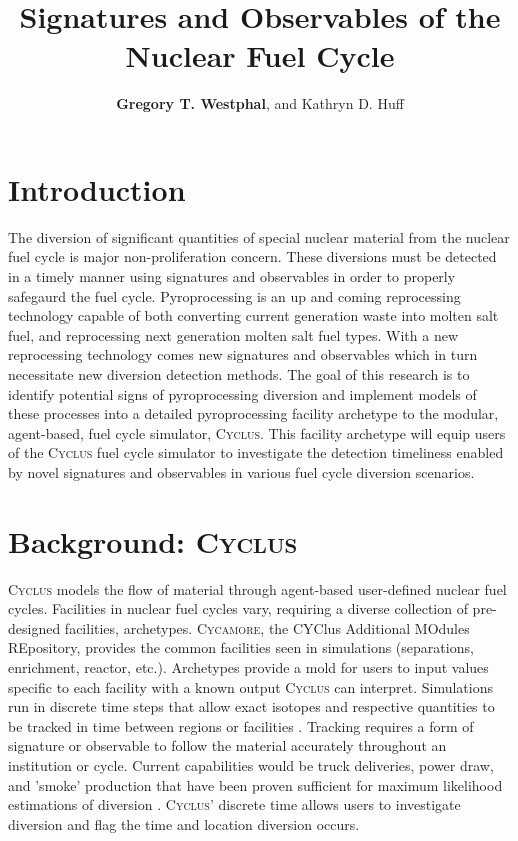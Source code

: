 \documentclass{anstrans}
\title{Signatures and Observables of the Nuclear Fuel Cycle}
\author{\textbf{Gregory T. Westphal}, and Kathryn D. Huff}
\institute{
Dept. of Nuclear, Plasma and Radiological Engineering, University of Illinois at Urbana-Champaign \\
gtw2@illinois.edu
}
\newcommand{\Cyclus}{\textsc{Cyclus}\xspace}%
\newcommand{\Cycamore}{\textsc{Cycamore}\xspace}%
\begin{document}
\section{Introduction}
The diversion of significant quantities of special nuclear material from the nuclear fuel cycle is major non-proliferation concern. These diversions must be detected in a timely manner using signatures and observables in order to properly safegaurd the fuel cycle. Pyroprocessing is an up and coming reprocessing technology capable of both converting current generation waste into molten salt fuel, and reprocessing next generation molten salt fuel types. With a new reprocessing technology comes new signatures and observables which in turn necessitate new diversion detection methods. The goal of this research is to identify potential signs of pyroprocessing diversion and implement models of these processes into a detailed pyroprocessing facility archetype to the modular, agent-based, fuel cycle simulator, \Cyclus. This facility archetype will equip users of the \Cyclus fuel cycle simulator to investigate the detection timeliness enabled by novel signatures and observables in various fuel cycle diversion scenarios.

\section{Background: \Cyclus}
\Cyclus models the flow of material through agent-based user-defined nuclear fuel cycles. Facilities in nuclear fuel cycles vary, requiring a diverse collection of pre-designed facilities, archetypes. \Cycamore, the CYClus Additional MOdules REpository, provides the common facilities seen in simulations (separations, enrichment, reactor, etc.). Archetypes provide a mold for users to input values specific to each facility with a known output \Cyclus can interpret. Simulations run in discrete time steps that allow exact isotopes and respective quantities to be tracked in time between regions or facilities \cite{huff_fundamental_2016}. Tracking requires a form of signature or observable to follow the material accurately throughout an institution or cycle. Current capabilities would be truck deliveries, power draw, and 'smoke' production that have been proven sufficient for maximum likelihood estimations of diversion \cite{Hou_2016,Yilmaz_2016}.
\Cyclus' discrete time allows users to investigate diversion and flag the time and location diversion occurs.
\end{document}
